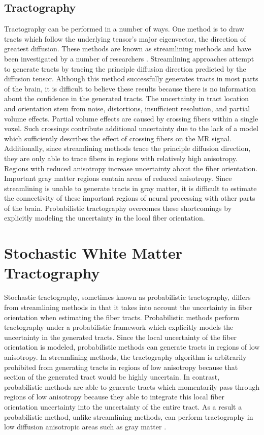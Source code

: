 \section{Tractography}
Tractography can be performed in a number of ways. One method is to draw tracts which follow the underlying tensor's major eigenvector, the direction of greatest diffusion.  These methods are known as streamlining methods and have been investigated by a number of researchers \cite{behrensMRM03}.  Streamlining approaches attempt to generate tracts by tracing the principle diffusion direction predicted by the diffusion tensor.  Although this method successfully generates tracts in most parts of the brain, it is difficult to believe these results because there is no information about the confidence in the generated tracts.  The uncertainty in tract location and orientation stem from noise, distortions, insufficient resolution, and partial volume effects.  Partial volume effects are caused by crossing fibers within a single voxel.  Such crossings contribute additional uncertainty due to the lack of a model which sufficiently describes the effect of crossing fibers on the MR signal.  Additionally, since streamlining methods trace the principle diffusion direction, they are only able to trace fibers in regions with relatively high anisotropy.  Regions with reduced anisotropy increase uncertainty about the fiber orientation.  Important gray matter regions contain areas of reduced anisotropy.  Since streamlining is unable to generate tracts in gray matter, it is difficult to estimate the connectivity of these important regions of neural processing with other parts of the brain.  Probabilistic tractography overcomes these shortcomings by explicitly modeling the uncertainty in the local fiber orientation.

\chapter{Stochastic White Matter Tractography}
Stochastic tractography, sometimes known as probabilistic tractography, differs from streamlining methods in that it takes into account the uncertainty in fiber orientation when estimating the fiber tracts.  Probabilistic methods perform tractography under a probabilistic framework which explicitly models the uncertainty in the generated tracts.  Since the local uncertainty of the fiber orientation is modeled, probabilistic methods can generate tracts in regions of low anisotropy.  In streamlining methods, the tractography algorithm is arbitrarily prohibited from generating tracts in regions of low anisotropy because that section of the generated tract would be highly uncertain.  In contrast, probabilistic methods are able to generate tracts which momentarily pass through regions of low anisotropy because they able to integrate this local fiber orientation uncertainty into the uncertainty of the entire tract. As a result a probabilistic method, unlike streamlining methods, can perform tractography in low diffusion anisotropic areas such as gray matter \cite{behrensMRM03}.

